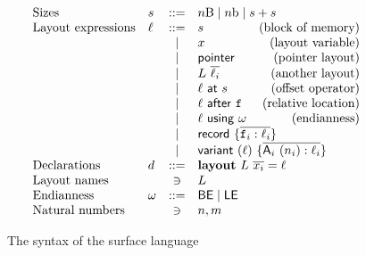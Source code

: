 \begin{figure}
$$
  \begin{array}{llclr}
  \text{Sizes} & s & ::= & \multicolumn{2}{l}{n\rB \mid n\rb \mid s + s} \\
  \text{Layout expressions} 
     & \ell & ::=  & s & \text{(block of memory)}\\
     &      & \mid & x & \text{(layout variable)} \\
     &      & \mid & \mathsf{pointer} & \text{(pointer layout)}\\
     &      & \mid & L\ \many{\ell_i} & \text{(another layout)}\\
     &      & \mid & \ell\ \mathsf{at}\ s & \text{(offset operator)}\\
     &      & \mid & \ell\ \mathsf{after}\ \FieldN{f} & \text{(relative location)}\\
     &      & \mid & \ell\ \mathsf{using}\ \omega & \text{(endianness)}\\
     &      & \mid & \multicolumn{2}{l}{\mathsf{record}\ \{ \overline{\FieldN{f}_i : \ell_i} \}} \\
     &      & \mid & \multicolumn{2}{l}{\mathsf{variant}\ (\ell)\ \{ \overline{\ConsN{A}_i\ (n_i) : \ell_i} \}} \\
  \text{Declarations} & d & ::= & \multicolumn{2}{l}{\mathbf{layout}\ L\ \many{x_i} = \ell} \\
  \text{Layout names} &   & \ni & L\\
  \text{Endianness} & \omega & ::= & \bigEnd \mid \littleEnd \\
  \text{Natural numbers} &   & \ni & n, m\\
\end{array}
$$
\caption{The syntax of the \Dargent surface language}
\label{fig:dargent-syntax}
\end{figure}
